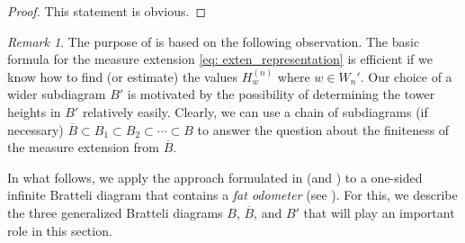\documentclass[11pt,reqno]{amsart}
\theoremstyle{definition}
\theoremstyle{remark}
\newtheorem{remark}[definition]{Remark}
\theoremstyle{plain}
\def\ol{\overline}
\numberwithin{equation}{section}
\begin{document}
\begin{proof}
This statement is obvious. 
\end{proof}

\begin{remark}\label{rem: step_step}
The purpose of  is based on the following observation. The basic formula for the measure extension 
\eqref{eq: exten_representation} is efficient if we know how to find 
(or estimate) the values $H_w^{(n)}$ where $w \in W_n'$. Our choice of a wider subdiagram $B'$ is motivated by the possibility of determining the tower heights in $B'$ relatively easily. Clearly, we can use a chain of subdiagrams (if necessary) 
$\ol B\subset B_1\subset B_2\subset \cdots \subset B$ to answer the question about the finiteness of the measure extension from $\ol B$.
\end{remark} 

In what follows, we apply the approach formulated in  (and ) to a one-sided infinite Bratteli diagram that contains a 
\textit{fat odometer} (see ). For this, we describe the three generalized Bratteli diagrams $B$, $\ol B$, and $B'$ that will play an important role in this section.
\end{document}
